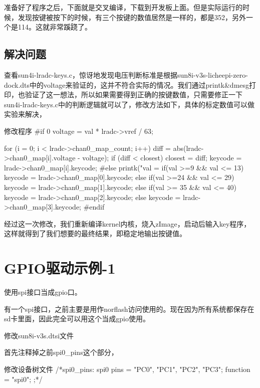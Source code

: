 \documentclass[lang=cn,newtx,10pt,scheme=chinese]{elegantbook}
\begin{document}
准备好了程序之后，下面就是交叉编译，下载到开发板上面。但是实际运行的时候，发现按键被按下的时候，有三个按键的数值居然是一样的，都是352，另外一个是114。这就非常蹊跷了。

\section{解决问题}

查看sun4i-lradc-keys.c，惊讶地发现电压判断标准是根据sun8i-v3s-licheepi-zero-dock.dts中的voltage来验证的，这并不符合实际的情况。我们通过printk\&dmesg打印，也验证了这一想法，所以如果需要得到正确的按键数值，只需要修正一下sun4i-lradc-keys.c中的判断逻辑就可以了，修改方法如下，具体的标定数值可以做实验来解决，

\begin{mycode}{修改程序}
#if 0
        voltage = val * lradc->vref / 63;

        for (i = 0; i < lradc->chan0_map_count; i++) {
            diff = abs(lradc->chan0_map[i].voltage - voltage);
            if (diff < closest) {
                closest = diff;
                keycode = lradc->chan0_map[i].keycode;
            }
        }
#else
        printk("val = %
        if(val >=9 && val <= 13)
            keycode = lradc->chan0_map[0].keycode;
        else if(val >=24 && val <= 29)
            keycode = lradc->chan0_map[1].keycode;
        else if(val >= 35 && val <= 40)
            keycode = lradc->chan0_map[2].keycode;
        else
            keycode = lradc->chan0_map[3].keycode;
#endif
\end{mycode}

经过这一次修改，我们重新编译kernel内核，烧入zImage，启动后输入key程序，这样就得到了我们想要的最终结果，即稳定地输出按键值。

\chapter{GPIO驱动示例-1}

使用spi接口当成gpio口。

有一个spi接口，之前主要是用作norflash访问使用的。现在因为所有系统都保存在sd卡里面，因此完全可以用这个当成gpio使用。

修改sun8i-v3s.dtsi文件

首先注释掉之前spi0\_pins这个部分，

\begin{mycode}{修改设备树文件}
/*spi0_pins: spi0 {
    pins = "PC0", "PC1", "PC2", "PC3";
    function = "spi0";
};*/
\end{mycode}
\end{document}
